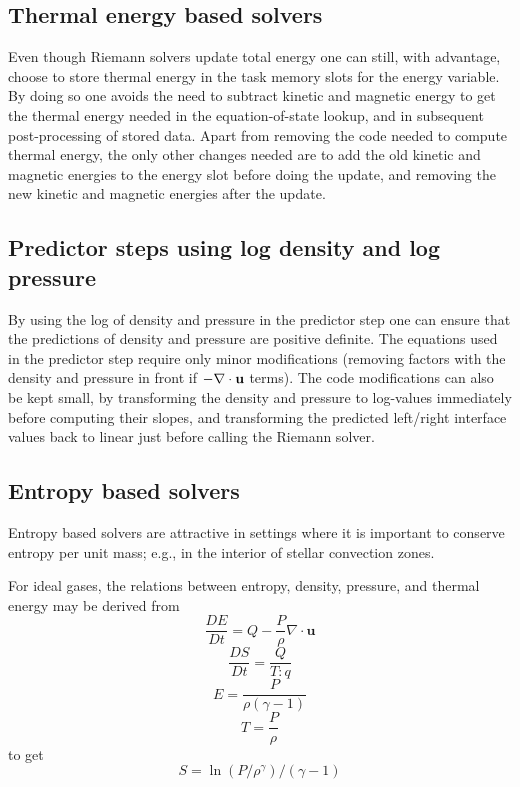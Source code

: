 \documentclass[paper=a4,fontsize=11pt]{scrartcl}
\numberwithin{equation}{section}		%
\numberwithin{figure}{section}			%
\numberwithin{table}{section}				%
\begin{document}
\subsection{Thermal energy based solvers}
Even though Riemann solvers update total energy one can still, with advantage, choose to store thermal energy in the task memory slots for the energy variable. By doing so one avoids the need to subtract kinetic and magnetic energy to get the thermal energy needed in the equation-of-state lookup, and in subsequent post-processing of stored data.  Apart from removing the code needed to compute thermal energy, the only other changes needed are to add the old kinetic and magnetic energies to the energy slot before doing the update, and removing the new kinetic and magnetic energies after the update.

\subsection{Predictor steps using log density and log pressure}
By using the log of density and pressure in the predictor step one can ensure that the predictions of density and pressure are positive definite.   The equations used in the predictor step require only minor modifications (removing factors with the density and pressure in front if $-\nabla\cdot\uu$ terms).  The code modifications can also be kept small, by transforming the density and pressure to log-values immediately before computing their slopes, and transforming the predicted left/right interface values back to linear just before calling the Riemann solver.

\subsection{Entropy based solvers}
\def\ek{e_{\mbox{kin}}}
\def\qk{q_{\mbox{kin}}}
\def\uu{\mathbf{u}}
\def\divU{\nabla\cdot\uu}
\newcommand{\DD}[2]{\frac{D #1}{D #2}}
\newcommand{\PP}[2]{\frac{\partial #1}{\partial #2}}
Entropy based solvers are attractive in settings where it is important to conserve entropy per unit mass; e.g., in the interior of stellar convection zones.

For ideal gases, the relations between entropy, density, pressure, and thermal energy may be derived from
\begin{equation}
 \DD{E}{t} = Q - \frac{P}{\rho} \divU
\end{equation}
\begin{equation}
 \DD{S}{t} = \frac{Q}{T:q}
\end{equation}
\begin{equation}
    E = \frac{P}{\rho (\gamma-1)}
\end{equation}
\begin{equation}
    T = \frac{P}{\rho}
\end{equation}
to get
\begin{equation}
    S = \ln(P/\rho^\gamma)/(\gamma-1)
\end{equation}
\end{document}
